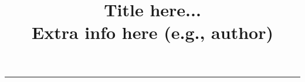\documentclass[12pt,a4paper,addpoints]{article}
\title{\textbf{Title here...} \\ Extra info here (e.g., author) \vspace{-1em}}
\date{}
\begin{document}
\maketitle
\hrule

\end{document}
